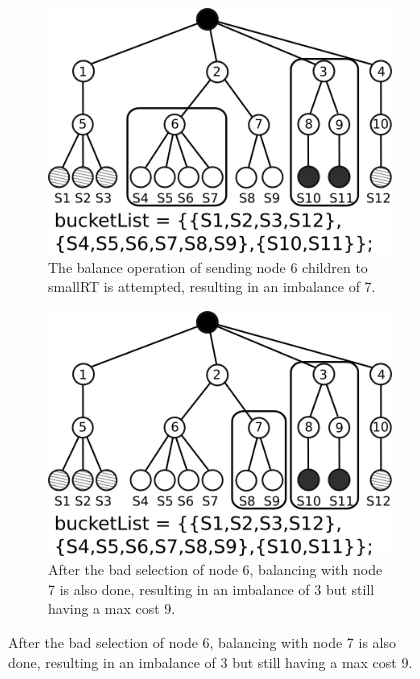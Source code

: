 \begin{figure}[t!]
	 \begin{subfigure}[t]{0.3\textwidth}
			 \centering
			 \includegraphics[width=\textwidth]{img/balance3}
			 \caption{The balance operation of sending node 6 children to smallRT is attempted, resulting in an imbalance of 7.}
			 \label{fig:balance3}
	 \end{subfigure}
	 \par\bigskip
	 \begin{subfigure}[t]{0.3\textwidth}
			 \centering
			 \includegraphics[width=\textwidth]{img/balance4}
			 \caption{After the bad selection of node 6, balancing with node 7 is also done, resulting in an imbalance of 3 but still having a max cost 9.}
			 \label{fig:balance4}
	 \end{subfigure}
	 \hspace{1mm}

\end{figure}
